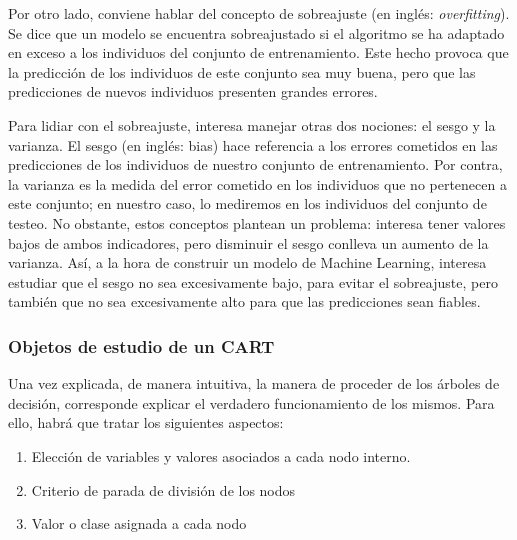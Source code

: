 \documentclass[12pt,twoside]{article}
\begin{document}
Por otro lado, conviene hablar del concepto de sobreajuste (en inglés: \textit{overfitting}). Se dice que un modelo se encuentra sobreajustado si el algoritmo se ha adaptado en exceso a los individuos del conjunto de entrenamiento. Este hecho provoca que la predicción de los individuos de este conjunto sea muy buena, pero que las predicciones de nuevos individuos presenten grandes errores.

Para lidiar con el sobreajuste, interesa manejar otras dos nociones: el sesgo y la varianza. El sesgo (en inglés: bias) hace referencia a los errores cometidos en las predicciones de los individuos de nuestro conjunto de entrenamiento. Por contra, la varianza es la medida del error cometido en los individuos que no pertenecen a este conjunto; en nuestro caso, lo mediremos en los individuos del conjunto de testeo. No obstante, estos conceptos plantean un problema: interesa tener valores bajos de ambos indicadores, pero disminuir el sesgo conlleva un aumento de la varianza. Así, a la hora de construir un modelo de Machine Learning, interesa estudiar que el sesgo no sea excesivamente bajo, para evitar el sobreajuste, pero también que no sea excesivamente alto para que las predicciones sean fiables.


\subsubsection{Objetos de estudio de un CART}

Una vez explicada, de manera intuitiva, la manera de proceder de los árboles de decisión, corresponde explicar el verdadero funcionamiento de los mismos. Para ello, habrá que tratar los siguientes aspectos:
\begin{enumerate}
\item Elección de variables y valores asociados a cada nodo interno.
\item Criterio de parada de división de los nodos
\item Valor o clase asignada a cada nodo
\end{enumerate}
\end{document}
